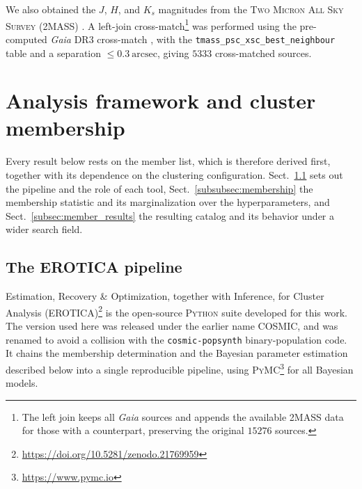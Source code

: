 \documentclass{aa}
\begin{document}
We also obtained the $J$, $H$, and $K_s$ magnitudes from the \textsc{Two Micron All Sky Survey} (2MASS) \citep{2006AJ....131.1163S}. A left-join cross-match\footnote{The left join keeps all \textit{Gaia} sources and appends the available 2MASS data for those with a counterpart, preserving the original $15276$ sources.} was performed using the pre-computed \textit{Gaia} DR3 cross-match \citep{2022gdr3.reptE..15M}, with the \texttt{tmass\_psc\_xsc\_best\_neighbour} table and a separation $\leq0.3~\mathrm{arcsec}$, giving $5333$ cross-matched sources.

\section{Analysis framework and cluster membership}\label{sec:membership}\label{sec:methodology}
Every result below rests on the member list, which is therefore derived first, together with its dependence on the clustering configuration. Sect.~\ref{subsec:cosmic} sets out the pipeline and the role of each tool, Sect.~\ref{subsubsec:membership} the membership statistic and its marginalization over the hyperparameters, and Sect.~\ref{subsec:member_results} the resulting catalog and its behavior under a wider search field.

\subsection{The \textsc{EROTICA} pipeline}\label{subsec:cosmic}
Estimation, Recovery \& Optimization, together with Inference, for Cluster Analysis (\textsc{EROTICA})\footnote{\url{https://doi.org/10.5281/zenodo.21769959}} is the open-source \textsc{Python} suite developed for this work. The version used here was released under the earlier name \textsc{COSMIC}, and was renamed to avoid a collision with the \texttt{cosmic-popsynth} binary-population code. It chains the membership determination and the Bayesian parameter estimation described below into a single reproducible pipeline, using \textsc{PyMC}\footnote{\url{https://www.pymc.io}} \citep{pymc2023} for all Bayesian models.
\end{document}
